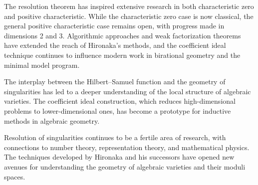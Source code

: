 The resolution theorem has inspired extensive research in both characteristic zero and positive characteristic. While the characteristic zero case is now classical, the general positive characteristic case remains open, with progress made in dimensions 2 and 3. Algorithmic approaches and weak factorization theorems have extended the reach of Hironaka's methods, and the coefficient ideal technique continues to influence modern work in birational geometry and the minimal model program.

The interplay between the Hilbert--Samuel function and the geometry of singularities has led to a deeper understanding of the local structure of algebraic varieties. The coefficient ideal construction, which reduces high-dimensional problems to lower-dimensional ones, has become a prototype for inductive methods in algebraic geometry.

Resolution of singularities continues to be a fertile area of research, with connections to number theory, representation theory, and mathematical physics. The techniques developed by Hironaka and his successors have opened new avenues for understanding the geometry of algebraic varieties and their moduli spaces.
